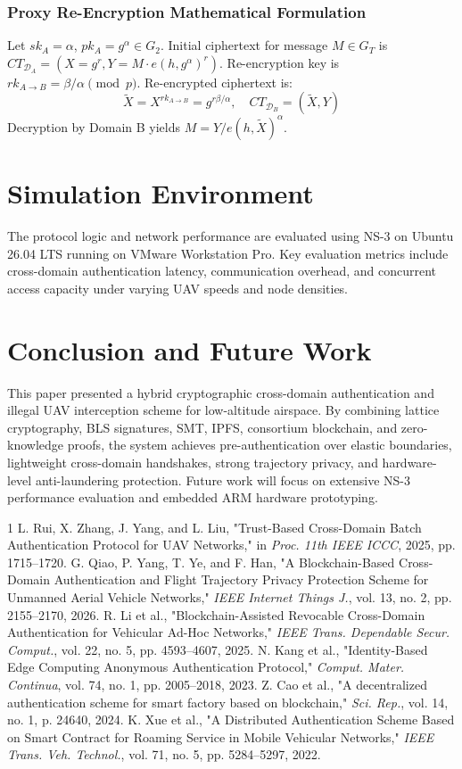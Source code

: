 \documentclass[lettersize,journal]{IEEEtran}
\begin{document}
\subsubsection{Proxy Re-Encryption Mathematical Formulation}
Let $sk_A = \alpha$, $pk_A = g^\alpha \in G_2$. Initial ciphertext for message $M \in G_T$ is $CT_{\mathcal{D}_A} = (X = g^r, Y = M \cdot e(h, g^\alpha)^r)$. Re-encryption key is $rk_{A \to B} = \beta / \alpha \pmod p$. Re-encrypted ciphertext is:
\begin{equation}
\tilde{X} = X^{rk_{A \to B}} = g^{r\beta/\alpha}, \quad CT_{\mathcal{D}_B} = (\tilde{X}, Y)
\end{equation}
Decryption by Domain B yields $M = Y / e(h, \tilde{X})^\alpha$.
\section{Simulation Environment}
The protocol logic and network performance are evaluated using NS-3 on Ubuntu 26.04 LTS running on VMware Workstation Pro. Key evaluation metrics include cross-domain authentication latency, communication overhead, and concurrent access capacity under varying UAV speeds and node densities.
\section{Conclusion and Future Work}
This paper presented a hybrid cryptographic cross-domain authentication and illegal UAV interception scheme for low-altitude airspace. By combining lattice cryptography, BLS signatures, SMT, IPFS, consortium blockchain, and zero-knowledge proofs, the system achieves pre-authentication over elastic boundaries, lightweight cross-domain handshakes, strong trajectory privacy, and hardware-level anti-laundering protection. Future work will focus on extensive NS-3 performance evaluation and embedded ARM hardware prototyping.
\begin{thebibliography}{1}
 L. Rui, X. Zhang, J. Yang, and L. Liu, "Trust-Based Cross-Domain Batch Authentication Protocol for UAV Networks," in \textit{Proc. 11th IEEE ICCC}, 2025, pp. 1715--1720.
 G. Qiao, P. Yang, T. Ye, and F. Han, "A Blockchain-Based Cross-Domain Authentication and Flight Trajectory Privacy Protection Scheme for Unmanned Aerial Vehicle Networks," \textit{IEEE Internet Things J.}, vol. 13, no. 2, pp. 2155--2170, 2026.
 R. Li et al., "Blockchain-Assisted Revocable Cross-Domain Authentication for Vehicular Ad-Hoc Networks," \textit{IEEE Trans. Dependable Secur. Comput.}, vol. 22, no. 5, pp. 4593--4607, 2025.
 N. Kang et al., "Identity-Based Edge Computing Anonymous Authentication Protocol," \textit{Comput. Mater. Continua}, vol. 74, no. 1, pp. 2005--2018, 2023.
 Z. Cao et al., "A decentralized authentication scheme for smart factory based on blockchain," \textit{Sci. Rep.}, vol. 14, no. 1, p. 24640, 2024.
 K. Xue et al., "A Distributed Authentication Scheme Based on Smart Contract for Roaming Service in Mobile Vehicular Networks," \textit{IEEE Trans. Veh. Technol.}, vol. 71, no. 5, pp. 5284--5297, 2022.
\end{thebibliography}
\end{document}
